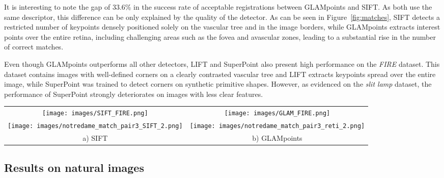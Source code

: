It is interesting to note the gap of 33.6\% in the success rate of acceptable registrations between \ac{GLAMpoints} and \ac{SIFT}. As both use the same descriptor, this difference can be only explained by the quality of the detector. As can be seen in Figure~\ref{fig:matches}, \ac{SIFT} detects a restricted number of keypoints densely positioned solely on the vascular tree and in the image borders, while \ac{GLAMpoints} extracts interest points over the entire retina, including challenging areas such as the fovea and avascular zones, leading to a substantial rise in the number of correct matches. 

Even though \ac{GLAMpoints} outperforms all other detectors, \ac{LIFT} and SuperPoint also present high performance on the \textit{\ac{FIRE}} dataset. This dataset contains images with well-defined corners on a clearly contrasted vascular tree and \ac{LIFT} extracts keypoints spread over the entire image, while SuperPoint was trained to detect corners on synthetic primitive shapes. However, as evidenced on the \textit{slit lamp} dataset, the performance of SuperPoint strongly deteriorates on images with less clear features. 

\begin{figure*}
\centering
\begin{tabular}{c c}
\texttt{[image: images/SIFT\_FIRE.png]} &
\texttt{[image: images/GLAM\_FIRE.png]} \\
\texttt{[image: images/notredame\_match\_pair3\_SIFT\_2.png]} &
\texttt{[image: images/notredame\_match\_pair3\_reti\_2.png]} \\
a) SIFT & b) GLAMpoints\\
\end{tabular}
\vspace{-2mm}
\caption{Interest points detected by a) SIFT  and b) GLAMpoints and corresponding matches for a pair of images from the \textit{\ac{FIRE}} (top) and \textit{Oxford} (bottom) datasets. Detected points are in white, green matches correspond to true positive, red to false positive. GLAMpoints finds considerably more true positive points than SIFT. }
\label{fig:matches}
\vspace{-3mm}
\end{figure*}



\subsection{Results on natural images}

